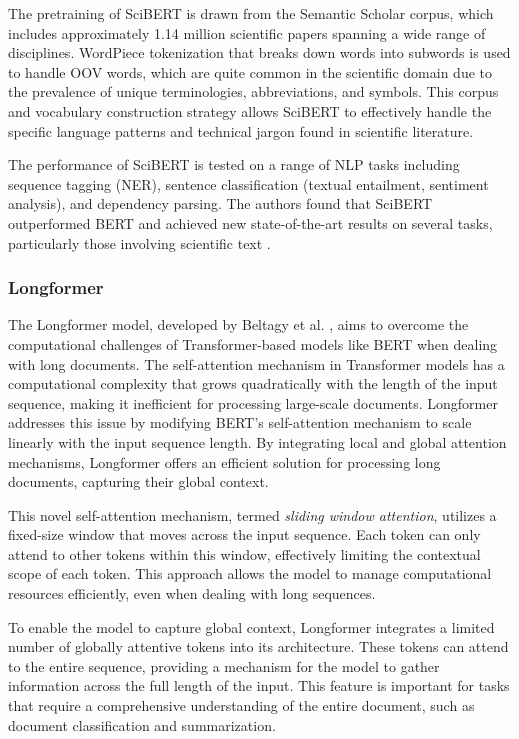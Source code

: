 The pretraining of SciBERT is drawn from the Semantic Scholar corpus, which includes approximately 1.14 million scientific papers spanning a wide range of disciplines.
WordPiece tokenization \cite{WuGoogleNeural2016} that breaks down words into subwords is used to handle \ac{OOV} words, which are quite common in the scientific domain due to the prevalence of unique terminologies, abbreviations, and symbols. This corpus and vocabulary construction strategy allows SciBERT to effectively handle the specific language patterns and technical jargon found in scientific literature.

The performance of SciBERT is tested on a range of \ac{NLP} tasks including sequence tagging (NER), sentence classification (textual entailment, sentiment analysis), and dependency parsing. The authors found that SciBERT outperformed BERT and achieved new state-of-the-art results on several tasks, particularly those involving scientific text \cite{BeltagySciBERTPretrained2019}.


\subsubsection*{Longformer}

The Longformer model, developed by Beltagy et al. \cite{BeltagyLongformerLongDocument2020}, aims to overcome the computational challenges of Transformer-based models like BERT when dealing with long documents. The self-attention mechanism in Transformer models has a computational complexity that grows quadratically with the length of the input sequence, making it inefficient for processing large-scale documents. Longformer addresses this issue by modifying BERT's self-attention mechanism to scale linearly with the input sequence length.
By integrating local and global attention mechanisms, Longformer offers an efficient solution for processing long documents, capturing their global context.

This novel self-attention mechanism, termed \emph{sliding window attention}, utilizes a fixed-size window that moves across the input sequence. Each token can only attend to other tokens within this window, effectively limiting the contextual scope of each token. This approach allows the model to manage computational resources efficiently, even when dealing with long sequences.

To enable the model to capture global context, Longformer integrates a limited number of globally attentive tokens into its architecture. These tokens can attend to the entire sequence, providing a mechanism for the model to gather information across the full length of the input. This feature is important for tasks that require a comprehensive understanding of the entire document, such as document classification and summarization.

